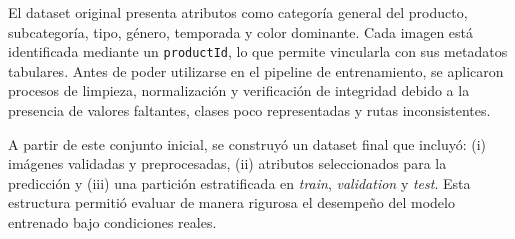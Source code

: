 El dataset original presenta atributos como categoría general del producto, subcategoría, tipo, género, temporada y color dominante. Cada imagen está identificada mediante un \texttt{productId}, lo que permite vincularla con sus metadatos tabulares. Antes de poder utilizarse en el pipeline de entrenamiento, se aplicaron procesos de limpieza, normalización y verificación de integridad debido a la presencia de valores faltantes, clases poco representadas y rutas inconsistentes.

A partir de este conjunto inicial, se construyó un dataset final que incluyó: (i) imágenes validadas y preprocesadas, (ii) atributos seleccionados para la predicción y (iii) una partición estratificada en \textit{train}, \textit{validation} y \textit{test}. Esta estructura permitió evaluar de manera rigurosa el desempeño del modelo entrenado bajo condiciones reales.
